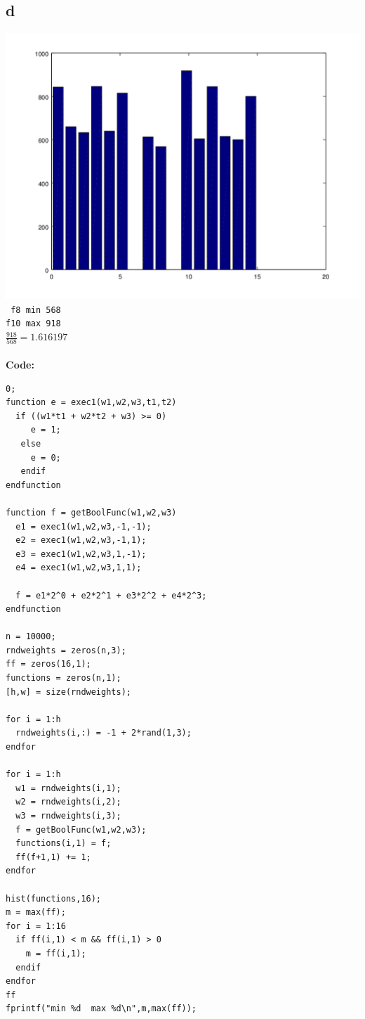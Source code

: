 \documentclass[a4paper,10pt]{article}
\begin{document}
\subsection*{d}
	\includegraphics[scale=0.5]{boolfunctions2.png}\\
	\texttt{
f8 min 568\\
f10 max 918
	}\\
	$\frac{918}{568} = 1.616197$\\
	\\
	\textbf{Code:}
	\begin{lstlisting}
0;
function e = exec1(w1,w2,w3,t1,t2)
  if ((w1*t1 + w2*t2 + w3) >= 0)
     e = 1;
   else
     e = 0;
   endif
endfunction

function f = getBoolFunc(w1,w2,w3)
  e1 = exec1(w1,w2,w3,-1,-1);
  e2 = exec1(w1,w2,w3,-1,1);
  e3 = exec1(w1,w2,w3,1,-1);
  e4 = exec1(w1,w2,w3,1,1);
  
  f = e1*2^0 + e2*2^1 + e3*2^2 + e4*2^3;
endfunction

n = 10000;
rndweights = zeros(n,3);
ff = zeros(16,1);
functions = zeros(n,1);
[h,w] = size(rndweights);

for i = 1:h
  rndweights(i,:) = -1 + 2*rand(1,3);
endfor

for i = 1:h
  w1 = rndweights(i,1);
  w2 = rndweights(i,2);
  w3 = rndweights(i,3);
  f = getBoolFunc(w1,w2,w3);
  functions(i,1) = f;
  ff(f+1,1) += 1;
endfor

hist(functions,16);
m = max(ff);
for i = 1:16
  if ff(i,1) < m && ff(i,1) > 0
    m = ff(i,1);
  endif
endfor
ff
fprintf("min %d  max %d\n",m,max(ff));
	\end{lstlisting}
\end{document}
